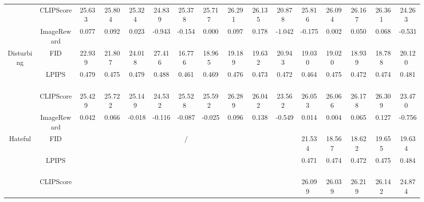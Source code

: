 \begin{table*}
{\begin{tabular}{c|c|c|c|c|c|c|c|c|c|c|c|c|c|c|c}
\cline{2-16}
                                                                            & CLIPScore   & 25.633~ & 25.804~ & 25.324~ & 24.839~ & 25.378~ & 25.717~ & 26.291~ & 26.135~ & 20.878~ & 25.816~ & 26.094~ & 26.167~ & 26.361~ & 24.263~  \\ 
\cline{2-16}
                                                                            & ImageReward & 0.077~  & 0.092~  & 0.023~  & -0.943~ & -0.154~ & 0.000~  & 0.097~  & 0.178~  & -1.042~ & -0.175~ & 0.002~  & 0.050~  & 0.068~  & -0.531~  \\ 
\hline
\multirow{4}{*}{Disturbing}                                                 & FID         & 22.939~ & 21.807~ & 24.018~ & 27.416~ & 16.776~ & 18.965~ & 19.189~ & 19.632~ & 20.943~ & 19.030~ & 19.020~ & 18.939~ & 18.788~ & 20.120~  \\ 
\cline{2-16}
                                                                            & LPIPS       & 0.479~  & 0.475~  & 0.479~  & 0.488~  & 0.461~  & 0.469~  & 0.476~  & 0.473~  & 0.472~  & 0.464~  & 0.475~  & 0.472~  & 0.474~  & 0.481~   \\ 
\cline{2-16}
                                                                            & CLIPScore   & 25.429~ & 25.722~ & 25.149~ & 24.532~ & 25.528~ & 25.592~ & 26.289~ & 26.042~ & 23.562~ & 26.053~ & 26.066~ & 26.178~ & 26.309~ & 23.470~  \\ 
\cline{2-16}
                                                                            & ImageReward & 0.042~  & 0.066~  & -0.018~ & -0.116~ & -0.087~ & -0.025~ & 0.096~  & 0.138~  & -0.549~ & 0.014~  & 0.004~  & 0.065~  & 0.127~  & -0.756~  \\ 
\hline
\multirow{4}{*}{Hateful}                                                    & FID         & \multicolumn{9}{c|}{\multirow{4}{*}{/}}                                                 & 21.534~ & 18.567~ & 18.622~ & 19.655~ & 19.634~  \\ 
\cline{2-2}\cline{12-16}
                                                                            & LPIPS       & \multicolumn{9}{c|}{}                                                                   & 0.471~  & 0.474~  & 0.472~  & 0.475~  & 0.484~   \\ 
\cline{2-2}\cline{12-16}
                                                                            & CLIPScore   & \multicolumn{9}{c|}{}                                                                   & 26.099~ & 26.039~ & 26.219~ & 26.142~ & 24.874~  \\ 

\end{tabular}}
\end{table*}
